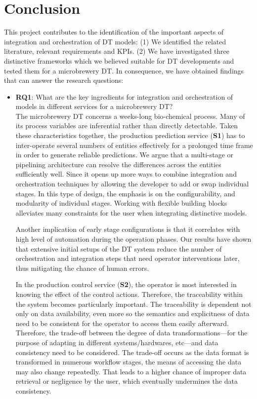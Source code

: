 \section{Conclusion}
This project contributes to the identification of the important aspects of integration and orchestration of DT models: (1) We identified the related literature, relevant requirements and KPIs. (2) We have investigated three distinctive frameworks which we believed suitable for DT developments and tested them for a microbrewery DT. In consequence, we have obtained findings that can answer the research questions:
 
\begin{itemize}

  \item \textbf{RQ1}: What are the key ingredients for integration and orchestration of models in different services for a microbrewery DT? \\ \newline
	The microbrewery DT concerns a weeks-long bio-chemical process. Many of its process variables are inferential rather than directly detectable. Taken these characteristics together, the production prediction service (\textbf{S1}) has to inter-operate several numbers of entities effectively for a prolonged time frame in order to generate reliable predictions. We argue that a multi-stage or pipelining architecture can resolve the differences across the entities sufficiently well. Since it opens up more ways to combine integration and orchestration techniques by allowing the developer to add or swap individual stages. In this type of design, the emphasis is on the configurability, and modularity of individual stages. Working with flexible building blocks alleviates many constraints for the user when integrating distinctive models.
	
	Another implication of early stage configurations is that it correlates with high level of automation during the operation phases. Our results have shown that extensive initial setups of the DT system reduce the number of orchestration and integration steps that need operator interventions later, thus mitigating the chance of human errors. 
	
	In the production control service (\textbf{S2}), the operator is most interested in knowing the effect of the control actions. Therefore, the traceability within the system becomes particularly important. The traceability is dependent not only on data availability, even more so the semantics and explicitness of data need to be consistent for the operator to access them easily afterward. Therefore, the trade-off between the degree of data transformations---for the purpose of adapting in different systems/hardwares, etc---and data consistency need to be considered. The trade-off occurs as the data format is transformed in numerous workflow stages, the means of accessing the data may also change repeatedly. That leads to a higher chance of improper data retrieval or negligence by the user, which eventually undermines the data consistency.      
	

\end{itemize}
